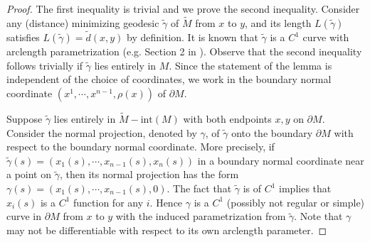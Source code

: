 \documentclass[11pt,letterpaper]{amsart}
\numberwithin{equation}{section}
\theoremstyle{definition}
\theoremstyle{plain}
\theoremstyle{definition}
\theoremstyle{plain}
\theoremstyle{definition}
\theoremstyle{plain}
\begin{document}
\begin{proof}
The first inequality is trivial and we prove the second inequality. Consider any (distance) minimizing geodesic $\widetilde{\gamma}$ of $\widetilde{M}$ from $x$ to $y$, and its length $L(\widetilde{\gamma})$ satisfies $L(\widetilde{\gamma})=\widetilde{d}(x,y)$ by definition. It is known that $\widetilde{\gamma}$ is a $C^1$ curve with arclength parametrization (e.g. Section 2 in \cite{ABB}). Observe that the second inequality follows trivially if $\widetilde{\gamma}$ lies entirely in $M$. Since the statement of the lemma is independent of the choice of coordinates, we work in the boundary normal coordinate $(x^1,\cdots,x^{n-1},\rho(x))$ of $\partial M$.

Suppose $\widetilde{\gamma}$ lies entirely in $\widetilde{M}-\textrm{int}(M)$ with both endpoints $x,y$ on $\partial M$. Consider the normal projection, denoted by $\gamma$, of $\widetilde{\gamma}$ onto the boundary $\partial M$ with respect to the boundary normal coordinate. More precisely, if $\widetilde{\gamma}(s)=(x_1(s),\cdots,x_{n-1}(s),x_n(s))$ in a boundary normal coordinate near a point on $\widetilde{\gamma}$, then its normal projection has the form $\gamma(s)=(x_1(s),\cdots,x_{n-1}(s),0)$. The fact that $\widetilde{\gamma}$ is of $C^1$ implies that $x_i(s)$ is a $C^1$ function for any $i$. Hence $\gamma$ is a $C^1$ (possibly not regular or simple) curve in $\partial M$ from $x$ to $y$ with the induced parametrization from $\widetilde{\gamma}$. Note that $\gamma$ may not be differentiable with respect to its own arclength parameter. 


\end{proof}
\end{document}
